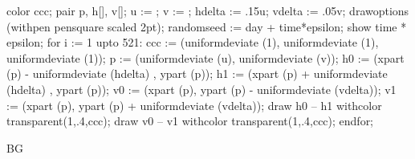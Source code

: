 color ccc;
pair p, h[], v[];
u := \overlaywidth; v := \overlayheight;
hdelta := .15u; vdelta := .05v;
drawoptions (withpen pensquare scaled 2pt);
randomseed := day + time*epsilon;
show time * epsilon;
for i := 1 upto 521:
    ccc := (uniformdeviate (1), uniformdeviate (1), uniformdeviate (1));
    p := (uniformdeviate (u), uniformdeviate (v));
    h0 := (xpart (p) - uniformdeviate (hdelta) , ypart (p));
    h1 := (xpart (p) + uniformdeviate (hdelta) , ypart (p));
    v0 := (xpart (p), ypart (p) - uniformdeviate (vdelta));
    v1 := (xpart (p), ypart (p) + uniformdeviate (vdelta));
    draw h0 -- h1 withcolor transparent(1,.4,ccc);
    draw v0 -- v1 withcolor transparent(1,.4,ccc);
endfor;
\stopuseMPgraphic

\startsetups BG
\setupbackgrounds[page][background=bg]
\stopsetups
{}

\startBG
\startstandardmakeup
\setuplayout[cover]
\vfill
\stopstandardmakeup
\stopBG